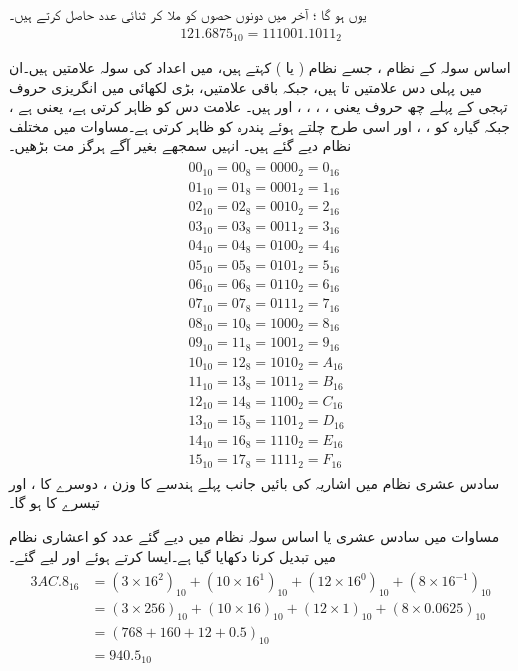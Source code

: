 یوں  ہو گا ؛ آخر میں دونوں حصوں کو ملا کر ثنائی عدد حاصل کرتے ہیں۔
\begin{align*}
121.6875_{10}=111001.1011_2
\end{align*}

	اساس سولہ کے نظام  ، جسے نظام (  یا  ) کہتے ہیں، میں اعداد کی سولہ علامتیں ہیں۔ان میں پہلی دس علامتیں  تا  ہیں، جبکہ باقی علامتیں، بڑی لکھائی میں انگریزی حروف تہجی کے پہلے چھ  حروف یعنی ، ، ، ،  اور  ہیں۔ علامت  دس  کو ظاہر کرتی ہے، یعنی  ہے ، جبکہ  گیارہ کو ، ، اور اسی طرح چلتے ہوئے  پندرہ کو ظاہر کرتی ہے۔مساوات  میں مختلف نظام دیے گئے ہیں۔ انہیں سمجھے بغیر آگے ہرگز مت بڑھیں۔ 
\begin{gather}
\begin{aligned}\label{مساوات_ثنائی_تمام}
&00_{10}=00_8=0000_2=0_{16}\\
&01_{10}=01_8=0001_2=1_{16}\\
&02_{10}=02_8=0010_2=2_{16}\\
&03_{10}=03_8=0011_2=3_{16}\\
&04_{10}=04_8=0100_2=4_{16}\\
&05_{10}=05_8=0101_2=5_{16}\\
&06_{10}=06_8=0110_2=6_{16}\\
&07_{10}=07_8=0111_2=7_{16}\\
&08_{10}=10_8=1000_2=8_{16}\\
&09_{10}=11_8=1001_2=9_{16}\\
&10_{10}=12_8=1010_2=A_{16}\\
&11_{10}=13_8=1011_2=B_{16}\\
&12_{10}=14_8=1100_2=C_{16}\\
&13_{10}=15_8=1101_2=D_{16}\\
&14_{10}=16_8=1110_2=E_{16}\\
&15_{10}=17_8=1111_2=F_{16}
\end{aligned}
\end{gather}
سادس عشری  نظام میں اشاریہ کی بائیں جانب پہلے ہندسے کا وزن ، دوسرے کا ، اور تیسرے کا  ہو گا۔ 

مساوات  میں سادس عشری یا اساس سولہ نظام میں دیے گئے عدد کو اعشاری نظام میں تبدیل کرنا دکھایا گیا ہے۔ایسا کرتے ہوئے  اور  لیے گئے۔
\begin{gather}
\begin{aligned}\label{مساوات_ثنائی_سادس}
3AC.8_{16}&=(3\times 16^2)_{10}+(10\times 16^1)_{10}+(12\times 16^0)_{10}+(8\times 16^{-1})_{10}\\
&=(3\times 256)_{10}+(10\times 16)_{10}+(12\times 1)_{10}+(8\times 0.0625)_{10}\\
&=(768+160+12+0.5)_{10}\\
&=940.5_{10}
\end{aligned}
\end{gather}

